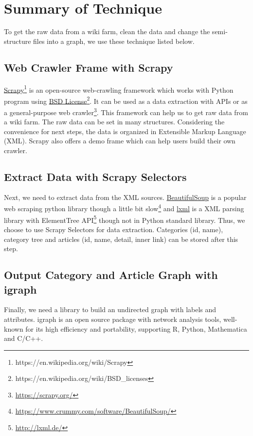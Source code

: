 \section{Summary of Technique}
\label{Ch-2:Sec:Summary of Technique}
To get the raw data from a wiki farm, clean the data and change the semi-structure files into a graph, we use these technique listed below.

\subsection{Web Crawler Frame with Scrapy}

\href{https://scrapy.org/}{Scrapy}\footnote{https://en.wikipedia.org/wiki/Scrapy} is an open-source web-crawling framework which works with Python program using \href{http://www.linfo.org/bsdlicense.html}{BSD License}\footnote{https://en.wikipedia.org/wiki/BSD\_licenses}. It can be used as a data extraction with APIs or as a general-purpose web crawler\footnote{\href{https://scrapy.org/}{https://scrapy.org/}}. This framework can help us to get raw data from a wiki farm. The raw data can be set in many structures. Considering the convenience for next steps, the data is organized in Extensible Markup Language (XML). Scrapy also offers a demo frame which can help users build their own crawler.\\

\subsection{Extract Data with Scrapy Selectors}
Next, we need to extract data from the XML sources. \href{https://www.crummy.com/software/BeautifulSoup/}{BeautifulSoup} is a popular web scraping python library though a little bit slow\footnote{\href{https://www.crummy.com/software/BeautifulSoup/}{https://www.crummy.com/software/BeautifulSoup/}} and \href{http://lxml.de/}{lxml} is a XML parsing library with ElementTree API\footnote{\href{http://lxml.de/}{http://lxml.de/}} though not in Python standard library. Thus, we choose to use Scrapy Selectors for data extraction. Categories (id, name), category tree and articles (id, name, detail, inner link) can be stored after this step.

\subsection{Output Category and Article Graph with igraph}
Finally, we need a library to build an undirected graph with labels and attributes. igraph is an open source package with network analysis tools, well-known for its high efficiency and portability, supporting R, Python, Mathematica and C/C++.

